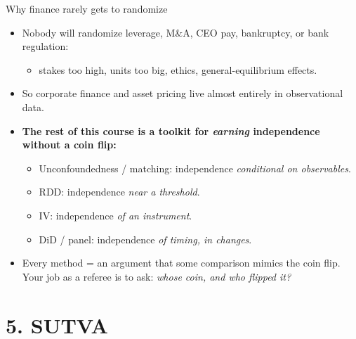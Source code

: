 \documentclass[
  11pt,
  ignorenonframetext,
  aspectratio=169,
]{beamer}
\providecommand{\tightlist}{%
  \setlength{\itemsep}{0pt}\setlength{\parskip}{0pt}}
\begin{document}
\begin{frame}{Why finance rarely gets to randomize}
\protect{}\label{why-finance-rarely-gets-to-randomize}
\begin{itemize}
\tightlist
\item
  Nobody will randomize leverage, M\&A, CEO pay, bankruptcy, or bank
  regulation:

  \begin{itemize}
  \tightlist
  \item
    stakes too high, units too big, ethics, general-equilibrium effects.
  \end{itemize}
\item
  So corporate finance and asset pricing live almost entirely in
  observational data.
\item
  \textbf{The rest of this course is a toolkit for \emph{earning}
  independence without a coin flip:}

  \begin{itemize}
  \tightlist
  \item
    Unconfoundedness / matching: independence \emph{conditional on
    observables}.
  \item
    RDD: independence \emph{near a threshold}.
  \item
    IV: independence \emph{of an instrument}.
  \item
    DiD / panel: independence \emph{of timing, in changes}.
  \end{itemize}
\item
  Every method = an argument that some comparison mimics the coin flip.
  Your job as a referee is to ask: \emph{whose coin, and who flipped
  it?}
\end{itemize}
\end{frame}

\section{5. SUTVA}\label{sutva}
\end{document}

